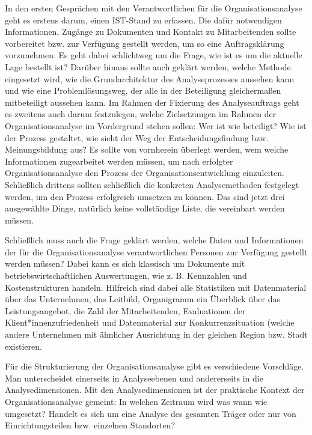 \documentclass[
  letterpaper,
]{book}
\begin{document}
In den ersten Gesprächen mit den Verantwortlichen für die
Organisationsanalyse geht es erstens darum, einen IST-Stand zu erfassen.
Die dafür notwendigen Informationen, Zugänge zu Dokumenten und Kontakt
zu Mitarbeitenden sollte vorbereitet bzw. zur Verfügung gestellt werden,
um so eine Auftragsklärung vorzunehmen. Es geht dabei schlichtweg um die
Frage, wie ist es um die aktuelle Lage bestellt ist? Darüber hinaus
sollte auch geklärt werden, welche Methode eingesetzt wird, wie die
Grundarchitektur des Analyseprozesses aussehen kann und wie eine
Problemlösungsweg, der alle in der Beteiligung gleichermaßen
mitbeteiligt aussehen kann. Im Rahmen der Fixierung des Analyseauftrags
geht es zweitens auch darum festzulegen, welche Zielsetzungen im Rahmen
der Organisationsanalyse im Vordergrund stehen sollen: Wer ist wie
beteiligt? Wie ist der Prozess gestaltet, wie sieht der Weg der
Entscheidungsfindung bzw. Meinungsbildung aus? Es sollte von vornherein
überlegt werden, wem welche Informationen zugearbeitet werden müssen, um
nach erfolgter Organisationsanalyse den Prozess der
Organisationsentwicklung einzuleiten. Schließlich drittens sollten
schließlich die konkreten Analysemethoden festgelegt werden, um den
Prozess erfolgreich umsetzen zu können. Das sind jetzt drei ausgewählte
Dinge, natürlich keine vollständige Liste, die vereinbart werden müssen.

Schließlich muss auch die Frage geklärt werden, welche Daten und
Informationen der für die Organisationsanalyse verantwortlichen Personen
zur Verfügung gestellt werden müssen? Dabei kann es sich klassisch um
Dokumente mit betriebswirtschaftlichen Auswertungen, wie z. B.
Kennzahlen und Kostenstrukturen handeln. Hilfreich sind dabei alle
Statistiken mit Datenmaterial über das Unternehmen, das Leitbild,
Organigramm ein Überblick über das Leistungsangebot, die Zahl der
Mitarbeitenden, Evaluationen der Klient*innenzufriedenheit und
Datenmaterial zur Konkurrenzsituation (welche andere Unternehmen mit
ähnlicher Ausrichtung in der gleichen Region bzw. Stadt existieren.

Für die Strukturierung der Organisationsanalyse gibt es verschiedene
Vorschläge. Man unterscheidet einerseits in Analyseebenen und
andererseits in die Analysedimensionen. Mit den Analysedimensionen ist
der praktische Kontext der Organisationsanalyse gemeint: In welchen
Zeitraum wird was wann wie umgesetzt? Handelt es sich um eine Analyse
des gesamten Träger oder nur von Einrichtungsteilen bzw. einzelnen
Standorten?
\end{document}
